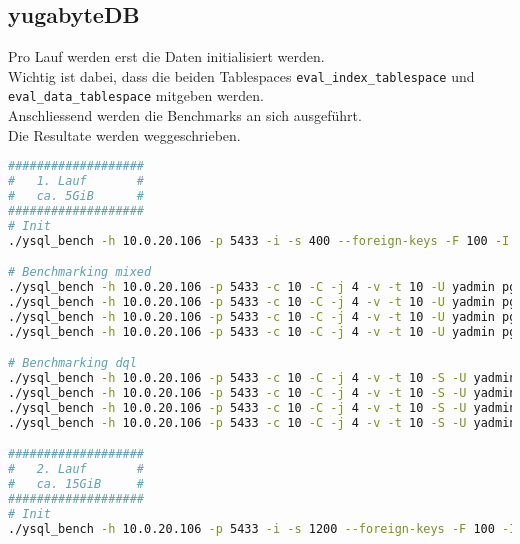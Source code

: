 
\begin{flushleft}
    \subsection{yugabyteDB}
    \label{subsec:yugabytedb_benchmarking_commands}
    Pro Lauf werden erst die Daten initialisiert werden.\\
    Wichtig ist dabei, dass die beiden Tablespaces \texttt{eval\_index\_tablespace} und \texttt{eval\_data\_tablespace} mitgeben werden.\\
    Anschliessend werden die Benchmarks an sich ausgeführt.\\
    Die Resultate werden weggeschrieben.
\lstset{style=gra_codestyle}
\begin{lstlisting}[language=bash, caption=YugabyteDB - Benchmarking-Commands,captionpos=b,label={lst:yugabytedb-benchmarking-commands},breaklines=true]
###################
#   1. Lauf       #
#   ca. 5GiB      #
###################
# Init
./ysql_bench -h 10.0.20.106 -p 5433 -i -s 400 --foreign-keys -F 100 -I dtgvpf --index-tablespace=eval_index_tablespace --tablespace=eval_data_tablespace -U yadmin pgbench_eval_bench

# Benchmarking mixed
./ysql_bench -h 10.0.20.106 -p 5433 -c 10 -C -j 4 -v -t 10 -U yadmin pgbench_eval_bench > /home/gramic/1_1_yugabytedb_mixed_benchmark.txt
./ysql_bench -h 10.0.20.106 -p 5433 -c 10 -C -j 4 -v -t 10 -U yadmin pgbench_eval_bench > /home/gramic/1_2_yugabytedb_mixed_benchmark.txt
./ysql_bench -h 10.0.20.106 -p 5433 -c 10 -C -j 4 -v -t 10 -U yadmin pgbench_eval_bench > /home/gramic/1_3_yugabytedb_mixed_benchmark.txt
./ysql_bench -h 10.0.20.106 -p 5433 -c 10 -C -j 4 -v -t 10 -U yadmin pgbench_eval_bench > /home/gramic/1_4_yugabytedb_mixed_benchmark.txt

# Benchmarking dql
./ysql_bench -h 10.0.20.106 -p 5433 -c 10 -C -j 4 -v -t 10 -S -U yadmin pgbench_eval_bench > /home/gramic/1_1_yugabytedb_dql_benchmark.txt
./ysql_bench -h 10.0.20.106 -p 5433 -c 10 -C -j 4 -v -t 10 -S -U yadmin pgbench_eval_bench > /home/gramic/1_2_yugabytedb_dql_benchmark.txt
./ysql_bench -h 10.0.20.106 -p 5433 -c 10 -C -j 4 -v -t 10 -S -U yadmin pgbench_eval_bench > /home/gramic/1_3_yugabytedb_dql_benchmark.txt
./ysql_bench -h 10.0.20.106 -p 5433 -c 10 -C -j 4 -v -t 10 -S -U yadmin pgbench_eval_bench > /home/gramic/1_3_yugabytedb_dql_benchmark.txt

###################
#   2. Lauf       #
#   ca. 15GiB     #
###################
# Init
./ysql_bench -h 10.0.20.106 -p 5433 -i -s 1200 --foreign-keys -F 100 -I dtgvpf --index-tablespace=eval_index_tablespace --tablespace=eval_data_tablespace -U yadmin pgbench_eval_bench


\end{lstlisting}
\end{flushleft}
